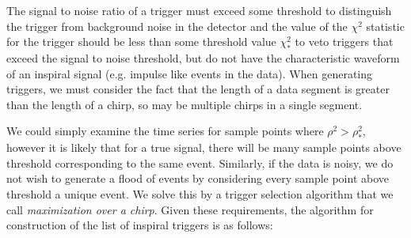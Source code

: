 The signal to noise ratio of a trigger must exceed some threshold to
distinguish the trigger from background noise in the detector and the value of
the $\chi^2$ statistic for the trigger should be less than some threshold
value $\chi^2_\ast$ to veto triggers that exceed the signal to noise
threshold, but do not have the characteristic waveform of an inspiral signal
(e.g. impulse like events in the data).   When generating triggers, we must
consider the fact that the length of a data segment is greater than the length
of a chirp, so may be multiple chirps in a single segment.

We could simply examine the time series for sample points where $\rho^2 >
\rho^2_\ast$, however it is likely that for a true signal, there will be many
sample points above threshold corresponding to the same event. Similarly, if
the data is noisy, we do not wish to generate a flood of events by considering
every sample point above threshold a unique event. We solve this by a trigger
selection algorithm that we call \emph{maximization over a chirp}. 
Given these requirements, the algorithm for construction of the list of
inspiral triggers is as follows:

